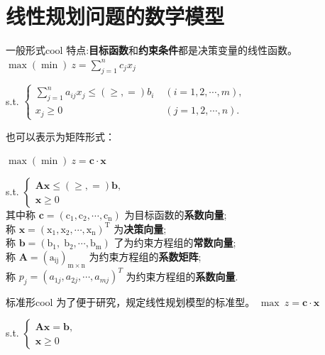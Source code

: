     \section{线性规划问题的数学模型}
    \begin{thmbox}{一般形式}{cool}
        特点:\textbf{目标函数}和\textbf{约束条件}都是决策变量的线性函数。
        \tcblower
        $\max(\min)\ z= \mathop{\sum}\limits_{j = 1}^{n}{c}_{j}{x}_{j}$

        s.t. $\begin{cases} \mathop{\sum }\limits_{j = 1}^{n}{a}_{ij}{x}_{j} \leq(\geq,=){b}_{i}\; & \left( {i = 1,2,\cdots ,m}\right) , \\  {x}_{j} \geq  0 & \left( {j = 1,2,\cdots ,n}\right) . \end{cases}$
        
        也可以表示为矩阵形式：
        
        $\max(\min)\ z = \mathbf{c}\cdot\mathbf{x}$

        s.t. $\begin{cases}\mathbf{A}\mathbf{x}\leq(\geq,=)\mathbf{b}, \\ \mathbf{x}\geq 0\end{cases}$\\
        其中称 $\mathbf{c} = \left( {{\mathrm{c}}_{1},{\mathrm{c}}_{2},\cdots ,{\mathrm{c}}_{\mathrm{n}}}\right)$ 为目标函数的\textbf{系数向量};\\
        称 $\mathbf{x} = {\left( {\mathrm{x}}_{1},{\mathrm{x}}_{2},\cdots ,{\mathrm{x}}_{\mathrm{n}}\right) }^{\mathrm{T}}$ 为\textbf{决策向量};\\
        称 $\mathbf{b} = \left( {{\mathrm{b}}_{1},{\mathrm{\;b}}_{2},\cdots ,{\mathrm{b}}_{\mathrm{m}}}\right)$ 了为约束方程组的\textbf{常数向量};\\
        称 $\mathbf{A} = {\left( {\mathrm{a}}_{\mathrm{{ij}}}\right) }_{\mathrm{m} \times  \mathrm{n}}$ 为约束方程组的\textbf{系数矩阵}; \\
        称 ${p}_{j} = {\left( {a}_{1j},{a}_{2j},\cdots ,{a}_{mj}\right) }^{T}$ 为约束方程组的\textbf{系数向量}.\\
    \end{thmbox}
    
    \begin{thmbox}{标准形}{cool}
        为了便于研究，规定线性规划模型的标准型。
        \tcblower
        $\max\ z = \mathbf{c}\cdot\mathbf{x}$

        s.t. $\begin{cases}\mathbf{A}\mathbf{x}=\mathbf{b}, \\ \mathbf{x}\geq 0\end{cases}$
    \end{thmbox}
    
